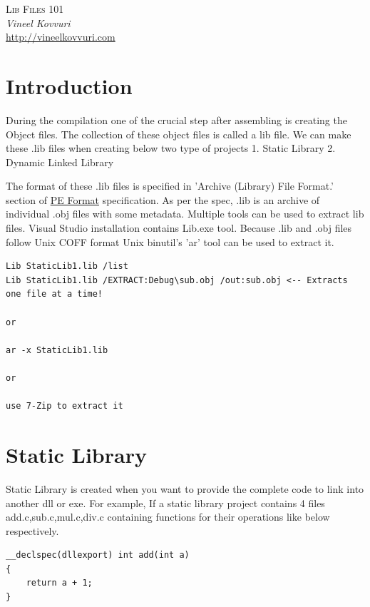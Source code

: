 \documentclass{article}
\begin{document}
\begin{titlepage}
   \begin{center}
      \Large\textsc{Lib Files 101}\\
      \vspace{5mm}
      \Large\textit{Vineel Kovvuri}\\
      \url{http://vineelkovvuri.com}\\
   \end{center}
\end{titlepage}

\newpage
\section{Introduction}
During the compilation one of the crucial step after assembling is
creating the Object files. The collection of these object files is
called a lib file. We can make these .lib files when creating below
two type of projects
1. Static Library
2. Dynamic Linked Library

The format of these .lib files is specified in 'Archive (Library) File Format.'
section of \href{https://docs.microsoft.com/en-us/windows/desktop/debug/pe-format#archive-library-file-format}{PE Format}
specification. As per the spec, .lib is an archive of individual .obj
files with some metadata. Multiple tools can be used to
extract lib files. Visual Studio installation contains Lib.exe tool.
Because .lib and .obj files follow Unix COFF format Unix binutil's
'ar' tool can be used to extract it.

\begin{verbatim}
Lib StaticLib1.lib /list
Lib StaticLib1.lib /EXTRACT:Debug\sub.obj /out:sub.obj <-- Extracts one file at a time!

or

ar -x StaticLib1.lib

or

use 7-Zip to extract it
\end{verbatim}

\section{Static Library}
Static Library is created when you want to provide the complete code to
link into another dll or exe. For example, If a static library
project contains 4 files add.c,sub.c,mul.c,div.c containing functions
for their operations like below respectively.
\begin{verbatim}
__declspec(dllexport) int add(int a)
{
    return a + 1;
}
\end{verbatim}
\end{document}
